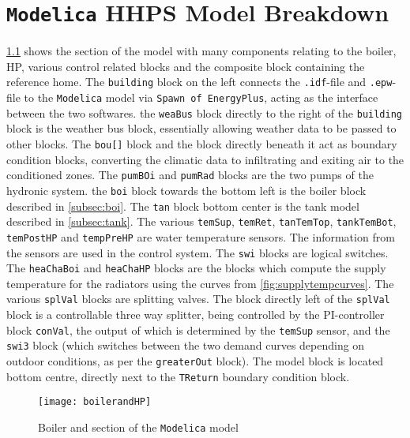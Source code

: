 \chapter{\texttt{Modelica} \acs{HHPS} Model Breakdown} \label{appx:modelbreakdown}

\cref{fig:boilerandhp} shows the section of the model with many components relating to the boiler, \ac{HP}, various control related blocks and the composite block containing the reference home. The \texttt{building} block on the left connects the \texttt{.idf}-file and \texttt{.epw}-file to the \texttt{Modelica} model via \texttt{Spawn of EnergyPlus}, acting as the interface between the two softwares. the \texttt{weaBus} block directly to the right of the \texttt{building} block is the weather bus block, essentially allowing weather data to be passed to other blocks. The \texttt{bou[]} block and the block directly beneath it act as boundary condition blocks, converting the climatic data to infiltrating and exiting air to the conditioned zones. The \texttt{pumBOi} and \texttt{pumRad} blocks are the two pumps of the hydronic system. the \texttt{boi} block towards the bottom left is the boiler block described in \cref{subsec:boi}. The \texttt{tan} block bottom center is the tank model described in \cref{subsec:tank}. The various \texttt{temSup}, \texttt{temRet}, \texttt{tanTemTop}, \texttt{tankTemBot}, \texttt{temPostHP} and \texttt{tempPreHP} are water temperature sensors. The information from the sensors are used in the control system. The \texttt{swi} blocks are logical switches. The \texttt{heaChaBoi} and \texttt{heaChaHP} blocks are the blocks which compute the supply temperature for the radiators using the curves from \cref{fig:supplytempcurves}. The various \texttt{splVal} blocks are splitting valves. The block directly left of the \texttt{splVal} block is a controllable three way splitter, being controlled by the PI-controller block \texttt{conVal}, the output of which is determined by the \texttt{temSup} sensor, and the \texttt{swi3} block (which switches between the two demand curves depending on outdoor conditions, as per the \texttt{greaterOut} block). The \HP model block is located bottom centre, directly next to the \texttt{TReturn} boundary condition block.
\begin{figure}[htb]
    \centering
    \texttt{[image: boilerandHP]}
    \caption{Boiler and \HP section of the \texttt{Modelica} model}
    \label{fig:boilerandhp}
\end{figure}

